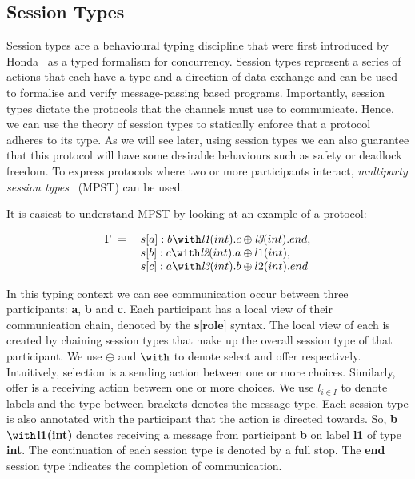 \subsection{Session Types}

Session types are a behavioural typing discipline that were first introduced by Honda~\cite{H93} as a typed formalism for concurrency.
Session types represent a series of actions that each have a type and a direction of data exchange and can be used to formalise and verify message-passing based programs.
Importantly, session types dictate the protocols that the channels must use to communicate.
Hence, we can use the theory of session types to statically enforce that a protocol adheres to its type.
As we will see later, using session types we can also guarantee that this protocol will have some desirable behaviours such as safety or deadlock freedom.
To express protocols where two or more participants interact, \textit{multiparty session types}~\cite{SY19} (MPST) can be used. 

It is easiest to understand MPST by looking at an example of a protocol:

\begin{equation}
    \label{eqn:mpst_example}
    \begin{array}{rl}
        \textbf{\ensuremath{\Gamma}} \; = \;  & s[a]:b\ensuremath{\with}\textit{l1}(int).c\ensuremath{\oplus}\textit{l3}(int).end, \cr
        & s[b]:c\ensuremath{\with}\textit{l2}(int).a\ensuremath{\oplus}l1(int), \cr
        & s[c]:a\ensuremath{\with}\textit{l3}(int).b\ensuremath{\oplus}l2(int).end
    \end{array}
\end{equation}

In this typing context we can see communication occur between three participants: \textbf{a}, \textbf{b} and \textbf{c}.
Each participant has a local view of their communication chain, denoted by the \ensuremath{\textbf{s[role]}} syntax.
The local view of each is created by chaining session types that make up the overall session type of that participant.
We use \ensuremath{\oplus} and \ensuremath{\with} to denote select and offer respectively.
Intuitively, selection is a sending action between one or more choices.
Similarly, offer is a receiving action between one or more choices.
We use \ensuremath{l_{i \in I}} to denote labels and the type between brackets denotes the message type.
Each session type is also annotated with the participant that the action is directed towards.
So, \textbf{b\ensuremath{\with}l1(int)} denotes receiving a message from participant \textbf{b} on label \textbf{l1} of type \textbf{int}.
The continuation of each session type is denoted by a full stop.
The \textbf{end} session type indicates the completion of communication.

